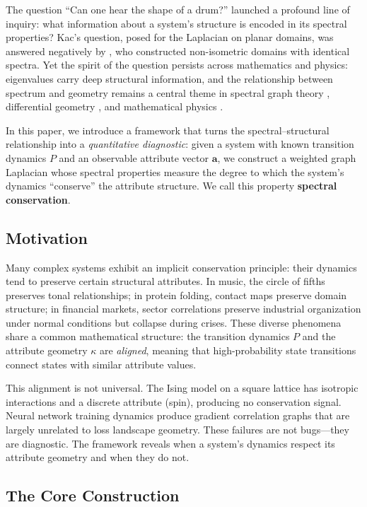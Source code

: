 \documentclass[12pt,letterpaper]{article}
\newcommand{\bfa}{\mathbf{a}}
\begin{document}
The question ``Can one hear the shape of a drum?'' \citep{kac1966} launched a profound line of inquiry: what information about a system's structure is encoded in its spectral properties? Kac's question, posed for the Laplacian on planar domains, was answered negatively by \citet{gordon1992}, who constructed non-isometric domains with identical spectra. Yet the spirit of the question persists across mathematics and physics: eigenvalues carry deep structural information, and the relationship between spectrum and geometry remains a central theme in spectral graph theory \citep{chung1997}, differential geometry \citep{berger2003}, and mathematical physics \citep{reed1978}.

In this paper, we introduce a framework that turns the spectral--structural relationship into a \emph{quantitative diagnostic}: given a system with known transition dynamics $P$ and an observable attribute vector $\bfa$, we construct a weighted graph Laplacian whose spectral properties measure the degree to which the system's dynamics ``conserve'' the attribute structure. We call this property \textbf{spectral conservation}.

\subsection{Motivation}

Many complex systems exhibit an implicit conservation principle: their dynamics tend to preserve certain structural attributes. In music, the circle of fifths preserves tonal relationships; in protein folding, contact maps preserve domain structure; in financial markets, sector correlations preserve industrial organization under normal conditions but collapse during crises. These diverse phenomena share a common mathematical structure: the transition dynamics $P$ and the attribute geometry $\kappa$ are \emph{aligned}, meaning that high-probability state transitions connect states with similar attribute values.

This alignment is not universal. The Ising model on a square lattice has isotropic interactions and a discrete attribute (spin), producing no conservation signal. Neural network training dynamics produce gradient correlation graphs that are largely unrelated to loss landscape geometry. These failures are not bugs---they are diagnostic. The framework reveals when a system's dynamics respect its attribute geometry and when they do not.

\subsection{The Core Construction}
\end{document}
